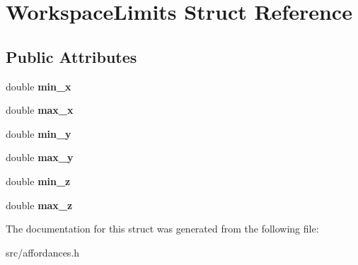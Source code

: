 \hypertarget{struct_workspace_limits}{\section{\-Workspace\-Limits \-Struct \-Reference}
\label{struct_workspace_limits}
}
\subsection*{\-Public \-Attributes}
\begin{DoxyCompactItemize}
\item 
\hypertarget{struct_workspace_limits_afc7f37b7f03b65a2b5616ec243d486a7}{double {\bfseries min\-\_\-x}}\label{struct_workspace_limits_afc7f37b7f03b65a2b5616ec243d486a7}

\item 
\hypertarget{struct_workspace_limits_ad53b3b5ff250cee9343164f75e38c662}{double {\bfseries max\-\_\-x}}\label{struct_workspace_limits_ad53b3b5ff250cee9343164f75e38c662}

\item 
\hypertarget{struct_workspace_limits_a74ffa937e08edde2fbed5a5520e692da}{double {\bfseries min\-\_\-y}}\label{struct_workspace_limits_a74ffa937e08edde2fbed5a5520e692da}

\item 
\hypertarget{struct_workspace_limits_a256e9a2a7ca32996650c9546a1c9e543}{double {\bfseries max\-\_\-y}}\label{struct_workspace_limits_a256e9a2a7ca32996650c9546a1c9e543}

\item 
\hypertarget{struct_workspace_limits_aa35171ec0a85afc55cbf9913ac5b36e2}{double {\bfseries min\-\_\-z}}\label{struct_workspace_limits_aa35171ec0a85afc55cbf9913ac5b36e2}

\item 
\hypertarget{struct_workspace_limits_a5518004bbf669a78cd788c2bbd4e0081}{double {\bfseries max\-\_\-z}}\label{struct_workspace_limits_a5518004bbf669a78cd788c2bbd4e0081}

\end{DoxyCompactItemize}


\-The documentation for this struct was generated from the following file\-:\begin{DoxyCompactItemize}
\item 
src/affordances.\-h\end{DoxyCompactItemize}
